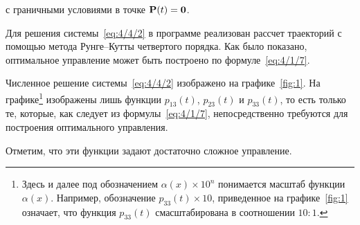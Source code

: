 \eeq

с граничными условиями в точке $\mathbf{P}(t) = \mathbf{0}$.

Для решения системы~\ref{eq:4/4/2} в программе реализован рассчет траекторий с помощью метода Рунге--Кутты четвертого порядка. Как было показано, оптимальное управление может быть построено по формуле~\vref{eq:4/1/7}.


Численное решение системы~\ref{eq:4/4/2} изображено на графике~\ref{fig:1}. На графике\footnote{Здесь и далее под обозначением $\alpha(x) \times 10^n$ понимается масштаб функции $\alpha(x)$. Например, обозначение $p_{33}(t) \times 10$, приведенное на графике~\ref{fig:1} означает, что функция $p_{33}(t)$ смасштабирована в соотношении $10:1$.} изображены лишь функции $p_{13}(t)$, $p_{23}(t)$ и $p_{33}(t)$, то есть только те, которые, как следует из формулы~\ref{eq:4/1/7}, непосредственно требуются для построения оптимального управления.

Отметим, что эти функции задают достаточно сложное управление.


